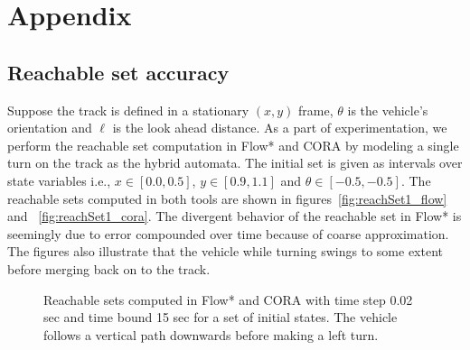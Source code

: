 \section{Appendix}

\subsection{Reachable set accuracy}
\label{subsec:appendix-reach-set-accuracy}
Suppose the track is defined in a stationary $(x, y)$ frame, $\theta$ is the vehicle's orientation and 
$\ell$ is the look ahead distance. 
%
As a part of experimentation, we perform the reachable set computation in Flow* and CORA by modeling a single turn on the track as the hybrid automata. 
%
The initial set is given as intervals over state variables i.e., $x \in [0.0, 0.5]$, $y \in [0.9, 1.1]$ and $\theta \in [-0.5, -0.5]$. 
%
The reachable sets computed in both tools are shown in figures~\ref{fig:reachSet1_flow} and ~\ref{fig:reachSet1_cora}. 
%
The divergent behavior of the reachable set in Flow* is seemingly due to error compounded over time because of coarse approximation. 
%
The figures also illustrate that the vehicle while turning swings to some extent before merging back on to the track.

\begin{figure*}
    \centering
    \caption{Reachable sets computed in Flow* and CORA with time step 0.02 sec and time bound 15 sec for a set of initial states. The vehicle follows a vertical path downwards before making  a left turn.}
\label{fig:reachSets}
\end{figure*}




